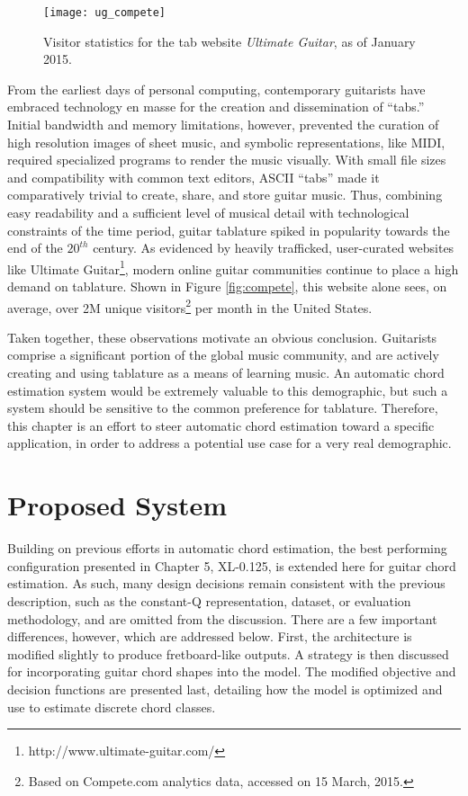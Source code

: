 \begin{figure}[t!]
  \centering
  \centerline{\texttt{[image: ug\_compete]}}
\caption{Visitor statistics for the tab website \emph{Ultimate Guitar}, as of January 2015.}
\label{fig:ug_compete}
%
\end{figure}

From the earliest days of personal computing, contemporary guitarists have embraced technology en masse for the creation and dissemination of ``tabs.''
Initial bandwidth and memory limitations, however, prevented the curation of high resolution images of sheet music, and symbolic representations, like MIDI, required specialized programs to render the music visually.
With small file sizes and compatibility with common text editors, ASCII ``tabs'' made it comparatively trivial to create, share, and store guitar music.
Thus, combining easy readability and a sufficient level of musical detail with technological constraints of the time period, guitar tablature spiked in popularity towards the end of the $20^{th}$ century.
As evidenced by heavily trafficked, user-curated websites like Ultimate Guitar\footnote{http://www.ultimate-guitar.com/}, modern online guitar communities continue to place a high demand on tablature.
Shown in Figure \ref{fig:compete}, this website alone sees, on average, over 2M unique visitors\footnote{Based on Compete.com analytics data, accessed on 15 March, 2015.} per month in the United States.

Taken together, these observations motivate an obvious conclusion.
Guitarists comprise a significant portion of the global music community, and are actively creating and using tablature as a means of learning music.
An automatic chord estimation system would be extremely valuable to this demographic, but such a system should be sensitive to the common preference for tablature.
Therefore, this chapter is an effort to steer automatic chord estimation toward a specific application, in order to address a potential use case for a very real demographic.


\section{Proposed System}

Building on previous efforts in automatic chord estimation, the best performing configuration presented in Chapter 5, XL-0.125, is extended here for guitar chord estimation.
As such, many design decisions remain consistent with the previous description, such as the constant-Q representation, dataset, or evaluation methodology, and are omitted from the discussion.
There are a few important differences, however, which are addressed below.
First, the architecture is modified slightly to produce fretboard-like outputs.
A strategy is then discussed for incorporating guitar chord shapes into the model.
The modified objective and decision functions are presented last, detailing how the model is optimized and use to estimate discrete chord classes.

